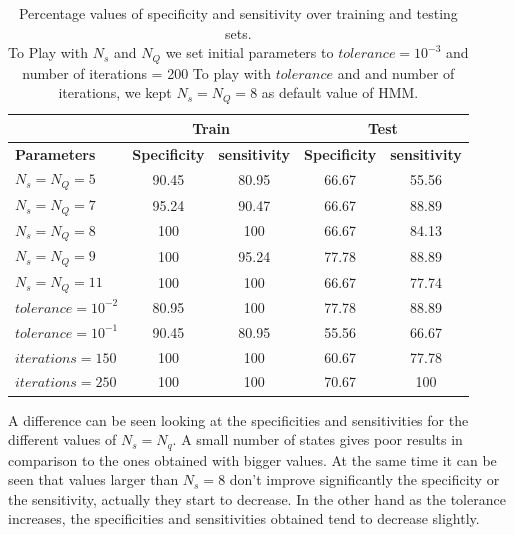 \documentclass[a4paper,12pt,oneside,titlepage]{article}
\begin{document}
	
	\begin{table}[H]
		\centering
		\begin{tabular}{|l|c|c|c|c|}
			\hline
			{} &  \multicolumn{2}{c|}{\textbf{Train}} & \multicolumn{2}{c|}{\textbf{Test}}\\ \hline
								
			\textbf{Parameters} & \textbf{Specificity} & \textbf{sensitivity} & \textbf{Specificity}& \textbf{sensitivity} \\ \hline
			$N_{s} = N_{Q} = 5$ & 90.45 & 80.95 & 66.67 & 55.56 \\
			$N_{s} = N_{Q} = 7$ & 95.24 & 90.47 & 66.67 & 88.89 \\
			$N_{s} = N_{Q} = 8$ & 100 & 100 & 66.67 & 84.13 \\
			$N_{s} = N_{Q} = 9$ & 100 & 95.24 & 77.78 & 88.89 \\
			$N_{s} = N_{Q} = 11$ & 100 & 100 & 66.67 & 77.74 \\\hline
			$tolerance = 10^{-2}$ & 80.95 & 100 & 77.78 & 88.89  \\
			$tolerance = 10^{-1}$ & 90.45 & 80.95 & 55.56 & 66.67  \\ \hline
			$iterations = 150$ & 100 & 100 & 60.67 & 77.78  \\
			$iterations = 250$ & 100 & 100 & 70.67 & 100  \\ \hline
		\end{tabular}	
		\caption{Percentage values of specificity and sensitivity over training and testing sets.\\
		To Play with $N_{s}$ and $N_{Q}$ we set initial parameters to $tolerance = 10^{-3}$ and number of iterations = 200
		To play with $tolerance$ and and number of iterations, we kept $N_{s} = N_{Q} = 8$ as default value of HMM.}
		\label{table1}		
	\end{table}

	A difference can be seen looking at the specificities and sensitivities for the different values of $N_{s} = N_{q}$. A small number of states gives poor results in comparison to the ones obtained with bigger values. At the same time it can be seen that values larger than $N_{s} = 8$ don't improve significantly the specificity or the sensitivity, actually they start to decrease.
	In the other hand as the tolerance increases, the specificities and sensitivities obtained tend to decrease slightly.
	 
\end{document}
